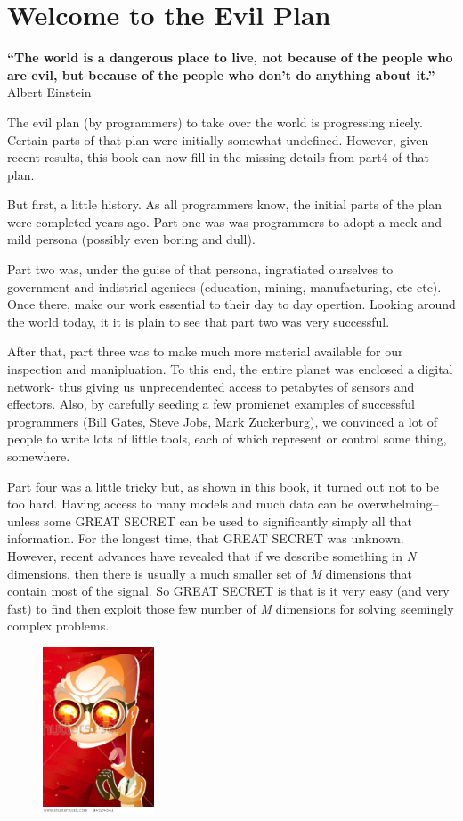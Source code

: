\section{Welcome to the Evil Plan}\label{welcome-to-the-evil-plan}

\textbf{``The world is a dangerous place to live, not because of the
people who are evil, but because of the people who don't do anything
about it.''} - Albert Einstein

The evil plan (by programmers) to take over the world is progressing
nicely. Certain parts of that plan were initially somewhat undefined.
However, given recent results, this book can now fill in the missing
details from part4 of that plan.

But first, a little history. As all programmers know, the initial parts
of the plan were completed years ago. Part one was was programmers to
adopt a meek and mild persona (possibly even boring and dull).

Part two was, under the guise of that persona, ingratiated ourselves to
government and indistrial agenices (education, mining, manufacturing,
etc etc). Once there, make our work essential to their day to day
opertion. Looking around the world today, it it is plain to see that
part two was very successful.

After that, part three was to make much more material available for our
inspection and manipluation. To this end, the entire planet was enclosed
a digital network- thus giving us unprecendented access to petabytes of
sensors and effectors. Also, by carefully seeding a few promienet
examples of successful programmers (Bill Gates, Steve Jobs, Mark
Zuckerburg), we convinced a lot of people to write lots of little tools,
each of which represent or control some thing, somewhere.

Part four was a little tricky but, as shown in this book, it turned out
not to be too hard. Having access to many models and much data can be
overwhelming-- unless some GREAT SECRET can be used to significantly
simply all that information. For the longest time, that GREAT SECRET was
unknown. However, recent advances have revealed that if we describe
something in \emph{N} dimensions, then there is usually a much smaller
set of \emph{M} dimensions that contain most of the signal. So GREAT
SECRET is that is it very easy (and very fast) to find then exploit
those few number of \emph{M} dimensions for solving seemingly complex
problems.

\begin{figure}
\includegraphics[width=1.3in]{img/evillaugh.jpg}
\end{figure}

